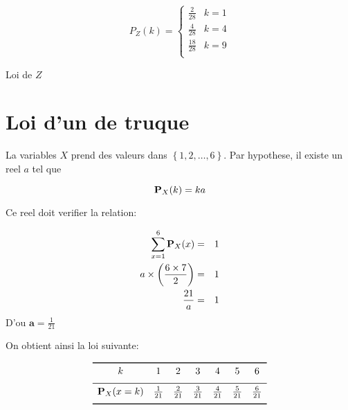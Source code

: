 \documentclass[a4paper]{tufte-handout}
\begin{document}
  \begin{equation*}
    P_Z(k) = \begin{cases}
      \frac{2}{28}    & k = 1\\[4pt]
      \frac{4}{28}    & k = 4\\[4pt]
      \frac{18}{28}    & k = 9\\[4pt]
    \end{cases}
  \end{equation*}
\begin{marginfigure}
\begin{center}
\end{center}
\caption{Loi de $Z$}%
\end{marginfigure}

\section{Loi d'un de truque}
La variables $X$ prend des valeurs dans $\left\{1,2,\ldots,6\right\}$. Par
hypothese, il existe un reel $a$ tel que 

$$
 \P_X(k) = ka
$$

Ce reel doit verifier la relation:

\begin{eqnarray}
  \sum_{x=1}^6 \P_X(x) &=& 1\\ 
  a \times \left(\frac{6\times 7}{2}\right) & = & 1\\
  \frac{21}{a}  & = & 1
\end{eqnarray}
D'ou $ \mathbf{a} = \frac{1}{21}$

On obtient ainsi la loi suivante:

\begin{table}[htpb]
  \centering
  $$
  \begin{array}{ccccccc}
    \toprule
    k & 1 & 2 & 3 & 4 & 5 & 6\\[4pt]
    \midrule
    \P_X(x=k) & \frac{1}{21}& \frac{2}{21} & \frac{3}{21} & \frac{4}{21} &
    \frac{5}{21} & \frac{6}{21}\\[4pt]
    \bottomrule
  \end{array} 
  $$
\end{table}
\end{document}

